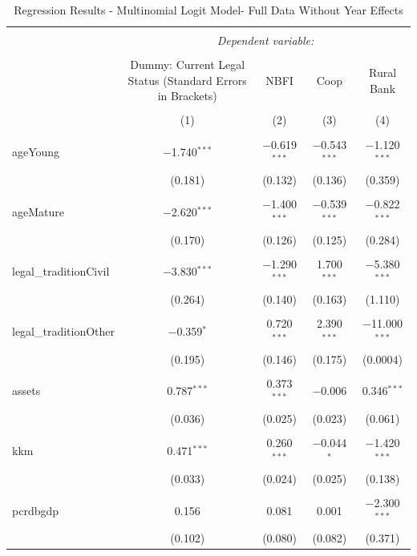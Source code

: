 \documentclass[a4paper,nobind]{templates/ociamthesis}
\begin{document}
\begin{table}[!htbp] \centering 
  \caption{Regression Results - Multinomial Logit Model- Full Data Without Year Effects} 
  \label{} 
\footnotesize 
\begin{tabular}{@{\extracolsep{5pt}}lcccc} 
\\[-1.8ex]\hline 
\hline \\[-1.8ex] 
 & \multicolumn{4}{c}{\textit{Dependent variable:}} \\ 
\cline{2-5} 
\\[-1.8ex] & Dummy: Current Legal Status (Standard Errors in Brackets) & NBFI & Coop & Rural Bank \\ 
\\[-1.8ex] & (1) & (2) & (3) & (4)\\ 
\hline \\[-1.8ex] 
 ageYoung & $-$1.740$^{***}$ & $-$0.619$^{***}$ & $-$0.543$^{***}$ & $-$1.120$^{***}$ \\ 
  & (0.181) & (0.132) & (0.136) & (0.359) \\ 
  & & & & \\ 
 ageMature & $-$2.620$^{***}$ & $-$1.400$^{***}$ & $-$0.539$^{***}$ & $-$0.822$^{***}$ \\ 
  & (0.170) & (0.126) & (0.125) & (0.284) \\ 
  & & & & \\ 
 legal\_traditionCivil & $-$3.830$^{***}$ & $-$1.290$^{***}$ & 1.700$^{***}$ & $-$5.380$^{***}$ \\ 
  & (0.264) & (0.140) & (0.163) & (1.110) \\ 
  & & & & \\ 
 legal\_traditionOther & $-$0.359$^{*}$ & 0.720$^{***}$ & 2.390$^{***}$ & $-$11.000$^{***}$ \\ 
  & (0.195) & (0.146) & (0.175) & (0.0004) \\ 
  & & & & \\ 
 assets & 0.787$^{***}$ & 0.373$^{***}$ & $-$0.006 & 0.346$^{***}$ \\ 
  & (0.036) & (0.025) & (0.023) & (0.061) \\ 
  & & & & \\ 
 kkm & 0.471$^{***}$ & 0.260$^{***}$ & $-$0.044$^{*}$ & $-$1.420$^{***}$ \\ 
  & (0.033) & (0.024) & (0.025) & (0.138) \\ 
  & & & & \\ 
 pcrdbgdp & 0.156 & 0.081 & 0.001 & $-$2.300$^{***}$ \\ 
  & (0.102) & (0.080) & (0.082) & (0.371) \\ 

\end{tabular}
\end{table}
\end{document}
